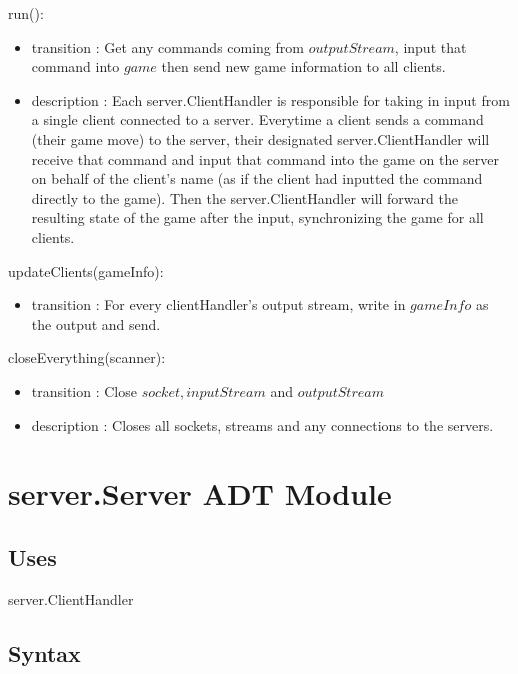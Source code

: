 \documentclass[12pt, titlepage]{article}
\begin{document}
        \noindent run():
        \begin{itemize}
        \item transition : Get any commands coming from $outputStream$, input that command into $game$ then send new game information to all clients.
        \item description : Each server.ClientHandler is responsible for taking in input from a single client connected to a server. Everytime a client sends a command (their game move) to the server, their designated server.ClientHandler will receive that command and input that command into the game on the server on behalf of the client's name (as if the client had inputted the command directly to the game). Then the server.ClientHandler will forward the resulting state of the game after the input, synchronizing the game for all clients.
        \end{itemize}
        
        \noindent updateClients(gameInfo):
        \begin{itemize}
        \item transition : For every clientHandler's output stream, write in $gameInfo$ as the output and send.
        \end{itemize}
        
        \noindent closeEverything(scanner):
        \begin{itemize}
        \item transition : Close $socket, inputStream$ and $outputStream$
        \item description : Closes all sockets,  streams and any connections to the servers.
        \end{itemize}
        
        
                        
        
\section* {server.Server ADT Module}
    \subsection* {Uses}
    server.ClientHandler
    \subsection* {Syntax}
    
\end{document}

